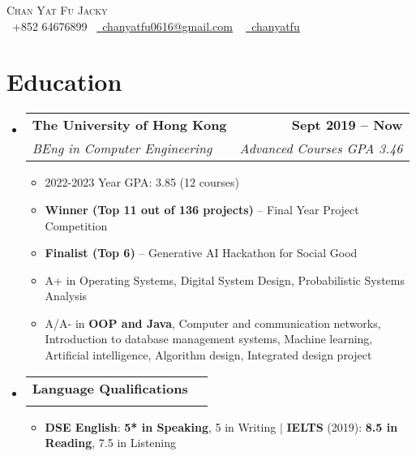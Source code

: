 \documentclass[a4paper,11pt]{article}
\makeatletter
\newcommand{\resumeItem}[1]{
  \item\small{
    {#1 \vspace{-2pt}}
  }
}
\newcommand{\resumeSubheading}[4]{
  \vspace{-2pt}\item
  \begin{tabular*}{1.0\textwidth}[t]{l@{\extracolsep{\fill}}r}
    \textbf{#1} & \textbf{\small #2} \\
    \textit{\small#3} & \textit{\small #4} \\
  \end{tabular*}\vspace{-7pt}
}
\newcommand{\resumeSubHeadingListStart}{\begin{itemize}[leftmargin=0.0in, label={}]}
\newcommand{\resumeSubHeadingListEnd}{\end{itemize}}
\newcommand{\resumeItemListStart}{\begin{itemize}}
\newcommand{\resumeItemListEnd}{\end{itemize}\vspace{-5pt}}
\makeatother
\begin{document}
\begin{center}
  {\Huge \scshape Chan Yat Fu Jacky} \\ \vspace{5pt}
  \small \raisebox{-0.1\height}\faPhone\ +852 64676899~ \href{mailto:chanyatfu0616@gmail.com}{\raisebox{-0.2\height}\faEnvelope\  \underline{chanyatfu0616@gmail.com}} ~
  \href{https://github.com/chanyatfu}{\raisebox{-0.2\height}\faGithub\ \underline{chanyatfu}}
  \vspace{-8pt}
\end{center}

\vspace{-16pt}
\section{Education}
\resumeSubHeadingListStart

\resumeSubheading
{The University of Hong Kong}{Sept 2019 -- Now}{BEng in Computer Engineering}{Advanced Courses GPA 3.46}
\resumeItemListStart
\resumeItem{2022-2023 Year GPA: 3.85 (12 courses)}
\resumeItem{\textbf{Winner (Top 11 out of 136 projects)} -- Final Year Project Competition}
\resumeItem{\textbf{Finalist (Top 6)} -- Generative AI Hackathon for Social Good}
\resumeItem{A+ in Operating Systems, Digital System Design, Probabilistic Systems Analysis}
\resumeItem{A/A- in \textbf{OOP and Java}, Computer and communication networks, Introduction to database management systems, Machine learning, Artificial intelligence, Algorithm design, Integrated design project}
\resumeItemListEnd

\vspace*{-4pt}

\resumeSubheading{Language Qualifications}{}{}{}\vspace*{-18pt}
\resumeItemListStart
\resumeItem{\textbf{DSE English}: \textbf{5* in Speaking}, 5 in Writing $|$ \textbf{IELTS} (2019): \textbf{8.5 in Reading}, 7.5 in Listening}
\resumeItemListEnd

\resumeSubHeadingListEnd
\vspace{-16pt}
\end{document}
